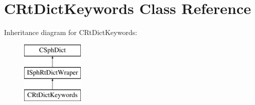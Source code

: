 \hypertarget{classCRtDictKeywords}{\section{C\-Rt\-Dict\-Keywords Class Reference}
\label{classCRtDictKeywords}
}
Inheritance diagram for C\-Rt\-Dict\-Keywords\-:\begin{figure}[H]
\begin{center}
\leavevmode
\includegraphics[height=3.000000cm]{classCRtDictKeywords}
\end{center}
\end{figure}
